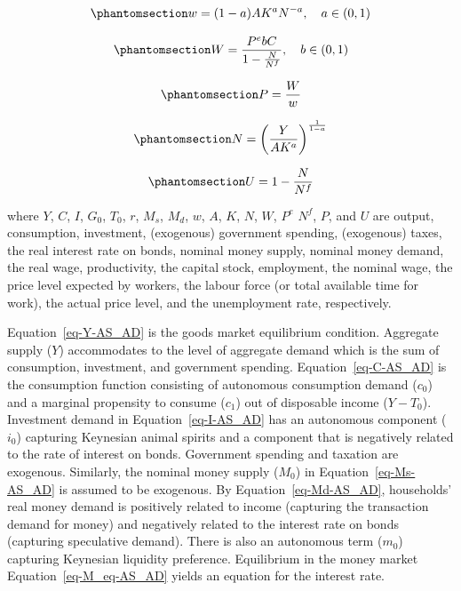 \documentclass[
  letterpaper,
  DIV=11,
  numbers=noendperiod]{scrreprt}
\begin{document}
\begin{equation}\phantomsection\label{eq-w-AS_AD}{
w=(1-a)AK^aN^{-a} ,\quad a\in (0,1) 
}\end{equation}

\begin{equation}\phantomsection\label{eq-W-AS_AD}{
W=\frac{P^ebC}{1-\frac{N}{N^f}},  \quad b \in (0,1)
}\end{equation}

\begin{equation}\phantomsection\label{eq-P-AS_AD}{
P=\frac{W}{w} 
}\end{equation}

\begin{equation}\phantomsection\label{eq-N-AS_AD}{
N=\left( \frac{Y}{AK^{a}}\right)^{\frac{1}{1-a}}
}\end{equation}

\begin{equation}\phantomsection\label{eq-U-AS_AD}{
U=1-\frac{N}{N^f} 
}\end{equation}

where \(Y\), \(C\), \(I\), \(G_0\), \(T_0\), \(r\), \(M_s\), \(M_d\),
\(w\), \(A\), \(K\), \(N\), \(W\), \(P^e\) \(N^f\), \(P\), and \(U\) are
output, consumption, investment, (exogenous) government spending,
(exogenous) taxes, the real interest rate on bonds, nominal money
supply, nominal money demand, the real wage, productivity, the capital
stock, employment, the nominal wage, the price level expected by
workers, the labour force (or total available time for work), the actual
price level, and the unemployment rate, respectively.

Equation~\ref{eq-Y-AS_AD} is the goods market equilibrium condition.
Aggregate supply (\(Y\)) accommodates to the level of aggregate demand
which is the sum of consumption, investment, and government spending.
Equation~\ref{eq-C-AS_AD} is the consumption function consisting of
autonomous consumption demand (\(c_0\)) and a marginal propensity to
consume (\(c_1\)) out of disposable income (\(Y-T_0\)). Investment
demand in Equation~\ref{eq-I-AS_AD} has an autonomous component
(\(i_0\)) capturing Keynesian animal spirits and a component that is
negatively related to the rate of interest on bonds. Government spending
and taxation are exogenous. Similarly, the nominal money supply
(\(M_0\)) in Equation~\ref{eq-Ms-AS_AD} is assumed to be exogenous. By
Equation~\ref{eq-Md-AS_AD}, households' real money demand is positively
related to income (capturing the transaction demand for money) and
negatively related to the interest rate on bonds (capturing speculative
demand). There is also an autonomous term (\(m_0\)) capturing Keynesian
liquidity preference. Equilibrium in the money market
Equation~\ref{eq-M_eq-AS_AD} yields an equation for the interest rate.
\end{document}
